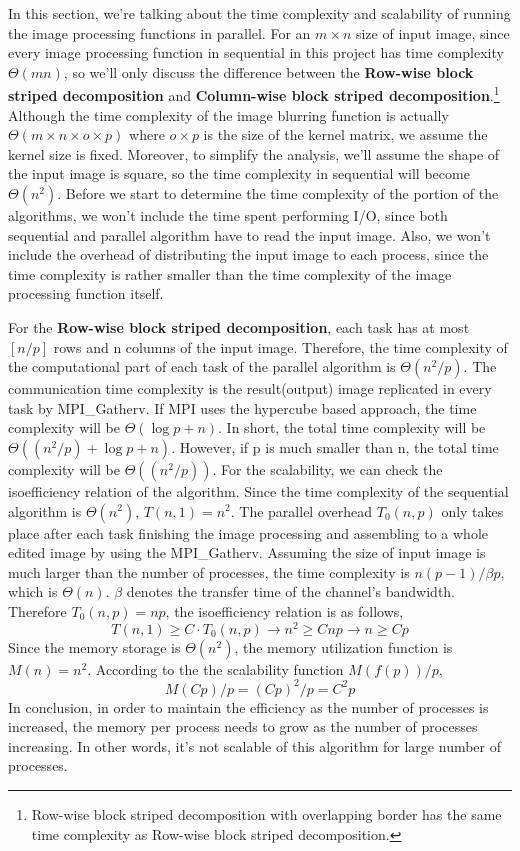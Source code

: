 \documentclass[12pt]{diazessay}
\begin{document}
In this section, we're talking about the time complexity and scalability of running the image processing functions in parallel. For an $m\times n$ size of input image, since every image processing function in sequential in this project has time complexity $\Theta(mn)$, so we'll only discuss the difference between the \textbf{Row-wise block striped decomposition} and \textbf{Column-wise block striped decomposition}.\footnote{Row-wise block striped decomposition with overlapping border has the same time complexity as Row-wise block striped decomposition.} Although the time complexity of the image blurring function is actually $\Theta(m\times n \times o \times p)$ where $o \times p$ is the size of the kernel matrix, we assume the kernel size is fixed. Moreover, to simplify the analysis, we'll assume the shape of the input image is square, so the time complexity in sequential will become $\Theta(n^2)$.
Before we start to determine the time complexity of the portion of the algorithms, we won't include the time spent performing I/O, since both sequential and parallel algorithm have to read the input image. Also, we won't include the overhead of distributing the input image to each process, since the time complexity is rather smaller than the time complexity of the image processing function itself. 

For the \textbf{Row-wise block striped decomposition}, each task has at most $[n/p]$ rows and n columns of the input image. Therefore, the time complexity of the computational part of each task of the parallel algorithm is $\Theta(n^2/p)$.\cite{ch7} The communication time complexity is the result(output) image replicated in every task by MPI\_Gatherv. If MPI uses the hypercube based approach, the time complexity will be $\Theta(\log p + n)$. In short, the total time complexity will be $\Theta((n^2/p)+\log p + n)$. However, if p is much smaller than n, the total time complexity will be $\Theta((n^2/p))$. For the scalability, we can check the isoefficiency relation of the algorithm. Since the time complexity of the sequential algorithm is $\Theta(n^2)$, $T(n,1)=n^2$. The parallel overhead $T_0(n,p)$ only takes place after each task finishing the image processing and assembling to a whole edited image by using the MPI\_Gatherv. Assuming the size of input image is much larger than the number of processes, the time complexity is $n(p-1)/\beta p$, which is $\Theta(n)$. $\beta$ denotes the transfer time of the channel's bandwidth. Therefore $T_0(n,p) = np$, the isoefficiency relation is as follows, $$T(n,1)\geq C \cdot T_0(n,p) \rightarrow n^2\geq Cnp \rightarrow n\geq Cp$$ Since the memory storage is $\Theta(n^2)$, the memory utilization function is $M(n)=n^2$. According to the the scalability function $M(f(p))/p$, $$M(Cp)/p=(Cp)^2/p=C^2p$$ In conclusion, in order to maintain the efficiency as the number of processes is increased, the memory per process needs to grow as the number of processes increasing. In other words, it's not scalable of this algorithm for large number of processes.
\end{document}
